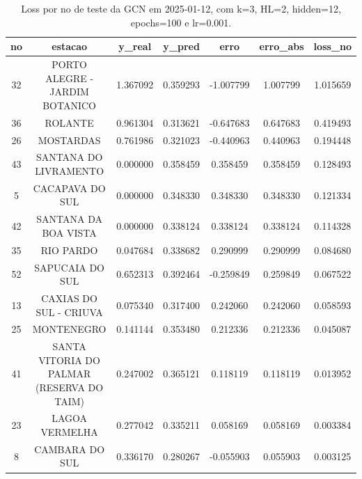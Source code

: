 \begin{table}[h]
\centering
\caption{Loss por no de teste da GCN em 2025-01-12, com k=3, HL=2, hidden=12, epochs=100 e lr=0.001.}
\label{tab:gcn_loss_k3_hl2_h12_e100_d20250112}
\begin{tabular}{ccccccc}
\toprule
no & estacao & y\_real & y\_pred & erro & erro\_abs & loss\_no \\
\midrule
32 & PORTO ALEGRE - JARDIM BOTANICO & 1.367092 & 0.359293 & -1.007799 & 1.007799 & 1.015659 \\
36 & ROLANTE & 0.961304 & 0.313621 & -0.647683 & 0.647683 & 0.419493 \\
26 & MOSTARDAS & 0.761986 & 0.321023 & -0.440963 & 0.440963 & 0.194448 \\
43 & SANTANA DO LIVRAMENTO & 0.000000 & 0.358459 & 0.358459 & 0.358459 & 0.128493 \\
5 & CACAPAVA DO SUL & 0.000000 & 0.348330 & 0.348330 & 0.348330 & 0.121334 \\
42 & SANTANA DA BOA VISTA & 0.000000 & 0.338124 & 0.338124 & 0.338124 & 0.114328 \\
35 & RIO PARDO & 0.047684 & 0.338682 & 0.290999 & 0.290999 & 0.084680 \\
52 & SAPUCAIA DO SUL & 0.652313 & 0.392464 & -0.259849 & 0.259849 & 0.067522 \\
13 & CAXIAS DO SUL - CRIUVA & 0.075340 & 0.317400 & 0.242060 & 0.242060 & 0.058593 \\
25 & MONTENEGRO & 0.141144 & 0.353480 & 0.212336 & 0.212336 & 0.045087 \\
41 & SANTA VITORIA DO PALMAR (RESERVA DO TAIM) & 0.247002 & 0.365121 & 0.118119 & 0.118119 & 0.013952 \\
23 & LAGOA VERMELHA & 0.277042 & 0.335211 & 0.058169 & 0.058169 & 0.003384 \\
8 & CAMBARA DO SUL & 0.336170 & 0.280267 & -0.055903 & 0.055903 & 0.003125 \\
\bottomrule
\end{tabular}
\end{table}

